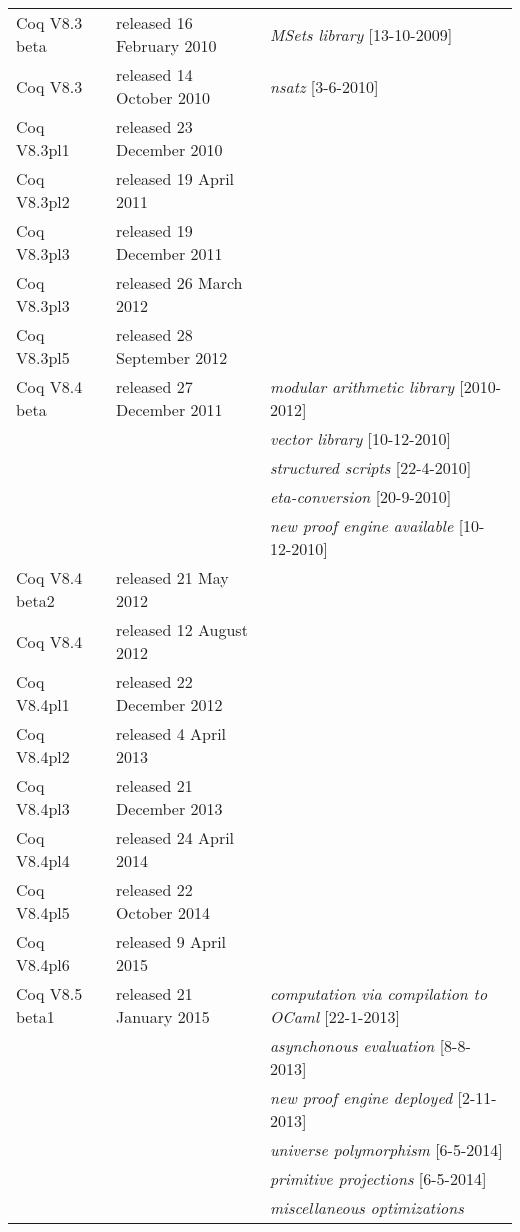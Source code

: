 \documentclass[a4paper]{book}
\newcommand{\feature}[1]{{\em #1}}
\begin{document}
\newpage
\mbox{}\\
\mbox{}\\
\begin{tabular}{l|l|l}
Coq V8.3 beta & released 16 February 2010 & \feature{MSets library} [13-10-2009] \\
Coq V8.3 & released 14 October 2010 & \feature{nsatz} [3-6-2010] \\
Coq V8.3pl1& released 23 December 2010 & \\
Coq V8.3pl2& released 19 April 2011 & \\
Coq V8.3pl3& released 19 December 2011 & \\
Coq V8.3pl3& released 26 March 2012 & \\
Coq V8.3pl5& released 28 September 2012 & \\
Coq V8.4 beta & released 27 December 2011 &  \feature{modular arithmetic library} [2010-2012]\\
&& \feature{vector library} [10-12-2010]\\
&& \feature{structured scripts} [22-4-2010]\\
&& \feature{eta-conversion} [20-9-2010]\\
&& \feature{new proof engine available} [10-12-2010]\\
Coq V8.4 beta2 & released 21 May 2012 & \\
Coq V8.4 & released 12 August 2012 &\\
Coq V8.4pl1& released 22 December 2012 & \\
Coq V8.4pl2& released 4 April 2013 & \\
Coq V8.4pl3& released 21 December 2013 & \\
Coq V8.4pl4& released 24 April 2014 & \\
Coq V8.4pl5& released 22 October 2014 & \\
Coq V8.4pl6& released 9 April 2015 & \\

Coq V8.5 beta1 & released 21 January 2015 & \feature{computation via compilation to OCaml} [22-1-2013]\\
&& \feature{asynchonous evaluation} [8-8-2013]\\
&& \feature{new proof engine deployed} [2-11-2013]\\
&& \feature{universe polymorphism} [6-5-2014]\\
&& \feature{primitive projections} [6-5-2014]\\
&& \feature{miscellaneous optimizations}\\


\end{tabular}
\end{document}
